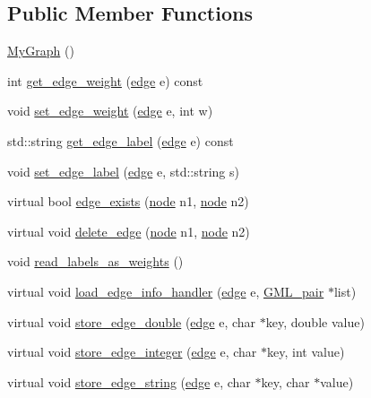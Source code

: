 \subsection*{Public Member Functions}
\begin{DoxyCompactItemize}
\item 
\mbox{\hyperlink{class_my_graph_a28bf434d062ec896de127989fe9ed303}{My\+Graph}} ()
\item 
int \mbox{\hyperlink{class_my_graph_aed4da227ae0cfe5565fa23acb4c4776c}{get\+\_\+edge\+\_\+weight}} (\mbox{\hyperlink{classedge}{edge}} e) const
\item 
void \mbox{\hyperlink{class_my_graph_a798846d9c09d7d5b49db3c75fb1f7f38}{set\+\_\+edge\+\_\+weight}} (\mbox{\hyperlink{classedge}{edge}} e, int w)
\item 
std\+::string \mbox{\hyperlink{class_my_graph_ae6bb4074fb50ab3f3bd811e64621b9fc}{get\+\_\+edge\+\_\+label}} (\mbox{\hyperlink{classedge}{edge}} e) const
\item 
void \mbox{\hyperlink{class_my_graph_a66d63b8b481c36437061989a868df064}{set\+\_\+edge\+\_\+label}} (\mbox{\hyperlink{classedge}{edge}} e, std\+::string s)
\item 
virtual bool \mbox{\hyperlink{class_my_graph_a67910a9535e93bc6dcf53e961760b6da}{edge\+\_\+exists}} (\mbox{\hyperlink{classnode}{node}} n1, \mbox{\hyperlink{classnode}{node}} n2)
\item 
virtual void \mbox{\hyperlink{class_my_graph_a4070383c56ef8f54e9fdc595d65b89de}{delete\+\_\+edge}} (\mbox{\hyperlink{classnode}{node}} n1, \mbox{\hyperlink{classnode}{node}} n2)
\item 
void \mbox{\hyperlink{class_my_graph_a5d90ef0fba45bbbdf53a3bfe6f9a7061}{read\+\_\+labels\+\_\+as\+\_\+weights}} ()
\item 
virtual void \mbox{\hyperlink{class_my_graph_aae6f9d1beab66851272f9064e2058064}{load\+\_\+edge\+\_\+info\+\_\+handler}} (\mbox{\hyperlink{classedge}{edge}} e, \mbox{\hyperlink{struct_g_m_l__pair}{G\+M\+L\+\_\+pair}} $\ast$list)
\item 
virtual void \mbox{\hyperlink{class_my_graph_a5814b5aa19c45ba8cf5004c8b9ae3667}{store\+\_\+edge\+\_\+double}} (\mbox{\hyperlink{classedge}{edge}} e, char $\ast$key, double value)
\item 
virtual void \mbox{\hyperlink{class_my_graph_a116ec287755233fe20469b6df4062ccc}{store\+\_\+edge\+\_\+integer}} (\mbox{\hyperlink{classedge}{edge}} e, char $\ast$key, int value)
\item 
virtual void \mbox{\hyperlink{class_my_graph_a3f10b4d50b97fc6f33a767e9db7fdd8b}{store\+\_\+edge\+\_\+string}} (\mbox{\hyperlink{classedge}{edge}} e, char $\ast$key, char $\ast$value)

\end{DoxyCompactItemize}

